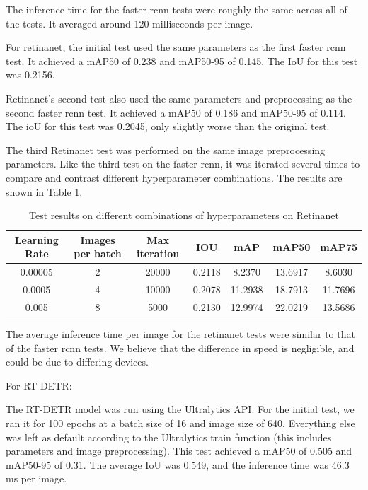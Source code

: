 \documentclass[stu,12pt,floatsintext]{apa7}
\begin{document}
The inference time for the faster rcnn tests were roughly the same across all of the tests. It averaged around 120 milliseconds per image.

For retinanet, the initial test used the same parameters as the first faster rcnn test. It achieved a mAP50 of 0.238 and mAP50-95 of 0.145. The IoU for this test was 0.2156.

Retinanet's second test also used the same parameters and preprocessing as the second faster rcnn test. It achieved a mAP50 of 0.186 and mAP50-95 of 0.114. The ioU for this test was 0.2045, only slightly worse than the original test.

The third Retinanet test was performed on the same image preprocessing parameters. Like the third test on the faster rcnn, it was iterated several times to compare and contrast different hyperparameter combinations. The results are shown in Table \ref{tab:retinanet}.  

\begin{table}[!htb]
	\centering
	\caption{Test results on different combinations of hyperparameters on Retinanet}
	\begin{tabular}{ccccccc}
		\hline
        Learning Rate & Images per batch & Max iteration & IOU & mAP & mAP50 & mAP75 \\
        \hline
        0.00005	 & 2 & 20000 & 0.2118 & 8.2370 & 13.6917 & 8.6030 \\
        0.0005	 & 4 & 10000 & 0.2078 & 11.2938 & 18.7913 & 11.7696 \\
        0.005    & 8 & 5000 & 0.2130 & 12.9974 & 22.0219 & 13.5686 \\
		\hline
	\end{tabular}
	\label{tab:retinanet}
\end{table}


The average inference time per image for the retinanet tests were similar to that of the faster rcnn tests. We believe that the difference in speed is negligible, and could be due to differing devices.


For RT-DETR:

The RT-DETR model was run using the Ultralytics API. For the initial test, we ran it for 100 epochs at a batch size of 16 and image size of 640. Everything else was left as default according to the Ultralytics train function (this includes parameters and image preprocessing). This test achieved a mAP50 of 0.505 and mAP50-95 of 0.31. The average IoU was 0.549, and the inference time was 46.3 ms per image.
\end{document}
